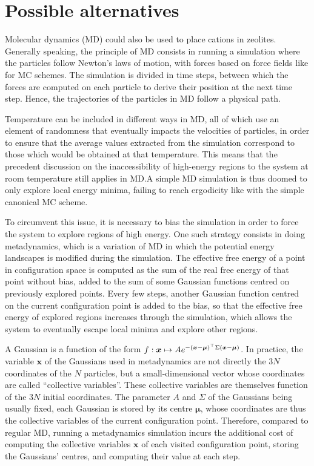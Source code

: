 \documentclass[main.tex]{subfiles}
\begin{document}
\section{Possible alternatives}

\label{metadynamics}

Molecular dynamics (MD) could also be used to place cations in zeolites. Generally speaking, the principle of MD consists in running a simulation where the particles follow Newton's laws of motion, with forces based on force fields like for MC schemes. The simulation is divided in time steps, between which the forces are computed on each particle to derive their position at the next time step. Hence, the trajectories of the particles in MD follow a physical path.

Temperature can be included in different ways in MD, all of which use an element of randomness that eventually impacts the velocities of particles, in order to ensure that the average values extracted from the simulation correspond to those which would be obtained at that temperature. This means that the precedent discussion on the inaccessibility of high-energy regions to the system at room temperature still applies in MD.\@ A simple MD simulation is thus doomed to only explore local energy minima, failing to reach ergodicity like with the simple canonical MC scheme.

To circumvent this issue, it is necessary to bias the simulation in order to force the system to explore regions of high energy. One such strategy consists in doing metadynamics\autocite{Metadynamics}, which is a variation of MD in which the potential energy landscapes is modified during the simulation. The effective free energy of a point in configuration space is computed as the sum of the real free energy of that point without bias, added to the sum of some Gaussian functions centred on previously explored points. Every few steps, another Gaussian function centred on the current configuration point is added to the bias, so that the effective free energy of explored regions increases through the simulation, which allows the system to eventually escape local minima and explore other regions.

A Gaussian is a function of the form $f:\boldsymbol x\mapsto Ae^{-\left(\boldsymbol x - \boldsymbol\mu\right)^\top\Sigma\left(\boldsymbol x - \boldsymbol\mu\right)}$. In practice, the variable $\boldsymbol x$ of the Gaussians used in metadynamics are not directly the $3N$ coordinates of the $N$ particles, but a small-dimensional vector whose coordinates are called ``collective variables''. These collective variables are themselves function of the $3N$ initial coordinates. The parameter $A$ and $\Sigma$ of the Gaussians being usually fixed, each Gaussian is stored by its centre $\boldsymbol\mu$, whose coordinates are thus the collective variables of the current configuration point. Therefore, compared to regular MD, running a metadynamics simulation incurs the additional cost of computing the collective variables $\boldsymbol x$ of each visited configuration point, storing the Gaussians' centres, and computing their value at each step.
\end{document}
